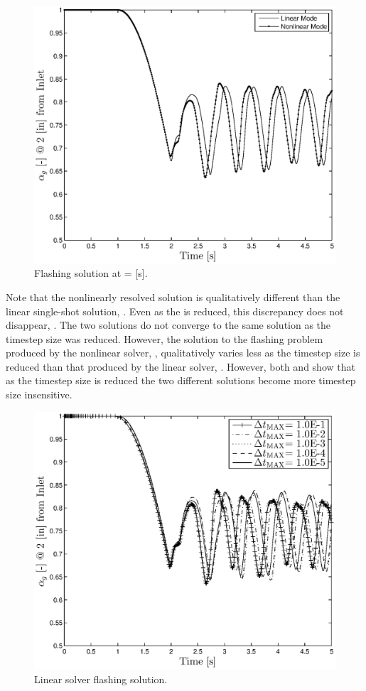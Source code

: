 \begin{figure}[h!tb]
\centering
\includegraphics[width=.6\textwidth]{plots/flashing_1em5.eps}
\caption{Flashing solution at \dtmax{} =  {[s]}.}
\label{fig:flashing_1em5}
\end{figure}

Note that the nonlinearly resolved solution is qualitatively different than the linear single-shot solution, .
Even as the \dtmax{} is reduced, this discrepancy does not disappear, .
The two solutions do not converge to the same solution as the timestep size was reduced.
However, the solution to the flashing problem produced by the nonlinear solver, , qualitatively varies less as the timestep size is reduced than that produced by the linear solver, .
However, both  and  show that as the timestep size is reduced the two different solutions become more timestep size insensitive.

\begin{figure}[h!tb]
\centering
\includegraphics[width=.6\textwidth]{plots/lin_flashing_al_2in.eps}
\caption{Linear solver flashing solution.}
\label{fig:cobra_mode_flashing}
\end{figure}

